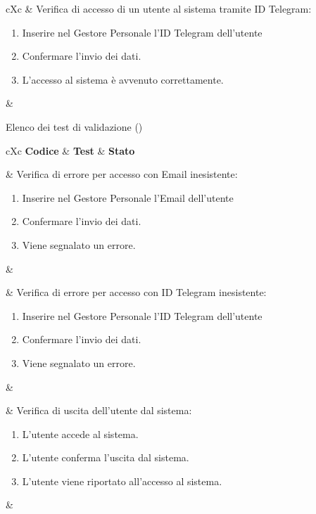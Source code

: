 \begin{table}[H]
\begin{VTtable}[1.7]{\textwidth}{cXc}
        \addtotv & Verifica di accesso di un utente al sistema tramite ID Telegram:
        \begin{enumerate}
            \item Inserire nel Gestore Personale l'ID Telegram dell'utente
            \item Confermare l'invio dei dati.
            \item L'accesso al sistema è avvenuto correttamente.
        \end{enumerate}
        & \TNI \\
        \bottomrule
	\end{VTtable}
	\caption{Elenco dei test di validazione (\thetableCounter)}
\end{table}

\begin{table}[H]
	\begin{VTtable}[1.7]{\textwidth}{cXc}
		\rowcolor{\tablegray}
		\textbf{Codice} & \centering\textbf{Test} & \textbf{Stato} \\\toprule

        \addtotv & Verifica di errore per accesso con Email inesistente:
        \begin{enumerate}
            \item Inserire nel Gestore Personale l'Email dell'utente
            \item Confermare l'invio dei dati.
            \item Viene segnalato un errore.
        \end{enumerate}
        & \TNI \\\midrule

        \addtotv & Verifica di errore per accesso con ID Telegram inesistente:
        \begin{enumerate}
            \item Inserire nel Gestore Personale l'ID Telegram dell'utente
            \item Confermare l'invio dei dati.
            \item Viene segnalato un errore.
        \end{enumerate}
        & \TNI \\\midrule

        \addtotv & Verifica di uscita dell'utente dal sistema:
        \begin{enumerate}
            \item L'utente accede al sistema.
            \item L'utente conferma l'uscita dal sistema.
            \item L'utente viene riportato all'accesso al sistema.
        \end{enumerate}
        & \TNI \\ \midrule


\end{VTtable}
\end{table}
